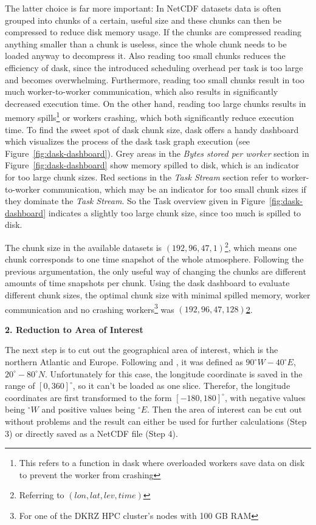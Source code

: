 The latter choice is far more important:  
In NetCDF datasets data is often grouped into chunks of a certain, useful size and these chunks can then be compressed to reduce disk memory usage. 
If the chunks are compressed reading anything smaller than a chunk is useless, since the whole chunk needs to be loaded anyway to decompress it. 
Also reading too small chunks reduces the efficiency of dask, since the introduced scheduling overhead per task is too large and becomes overwhelming.
Furthermore, reading too small chunks result in too much worker-to-worker communication, which also results in significantly decreased execution time. 
On the other hand, reading too large chunks results in memory spills\footnote{This refers to a function in dask where overloaded workers save data on disk to prevent the worker from crashing} or workers crashing, which both significantly reduce execution time. 
To find the sweet spot of dask chunk size, dask offers a handy dashboard which visualizes the process of the dask task graph execution (see Figure~\ref{fig:dask-dashboard}). 
Grey areas in the \textit{Bytes stored per worker} section in Figure~\ref{fig:dask-dashboard} show memory spilled to disk, which is an indicator for too large chunk sizes. 
Red sections in the \textit{Task Stream} section refer to worker-to-worker communication, which may be an indicator for too small chunk sizes if they dominate the \textit{Task Stream}. 
So the Task overview given in Figure~\ref{fig:dask-dashboard} indicates a slightly too large chunk size, since too much is spilled to disk. \cite{buckley_choosing_nodate}

The chunk size in the available datasets is $(192, 96, 47, 1)$\footnote{\label{vardims}Referring to $(lon, lat, lev, time)$}, which means one chunk corresponds to one time snapshot of the whole atmosphere.
Following the previous argumentation, the only useful way of changing the chunks are different amounts of time snapshots per chunk.
Using the dask dashboard to evaluate different chunk sizes, the optimal chunk size with minimal spilled memory, worker communication and no crashing workers\footnote{For one of the DKRZ HPC cluster's nodes with 100 GB RAM} was $(192, 96, 47, 128)$\cref{vardims}.  


\textbf{2. Reduction to Area of Interest}

The next step is to cut out the geographical area of interest, which is the northern Atlantic and Europe. 
Following \cite{vietinghoff_visual_2021} and \cite{hurrell_overview_2003}, it was defined as $90^\circ W - 40^\circ E$, $20^\circ - 80^\circ N$.
Unfortunately for this case, the longitude coordinate is saved in the range of $[0,360]^\circ$, so it can't be loaded as one slice. 
Therefor, the longitude coordinates are first transformed to the form $[-180, 180]^\circ$, with negative values being $^\circ W$ and positive values being $^\circ E$. 
Then the area of interest can be cut out without problems and the result can either be used for further calculations (Step 3) or directly saved as a NetCDF file (Step 4). 

